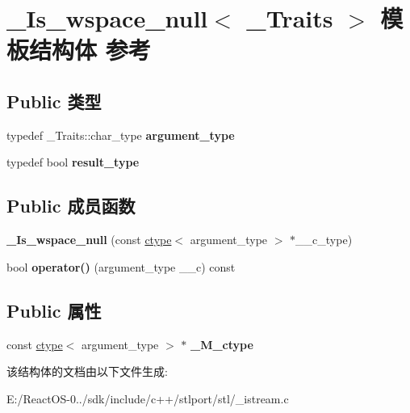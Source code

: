 \hypertarget{struct___is__wspace__null}{}\section{\+\_\+\+Is\+\_\+wspace\+\_\+null$<$ \+\_\+\+Traits $>$ 模板结构体 参考}
\label{struct___is__wspace__null}
\subsection*{Public 类型}
\begin{DoxyCompactItemize}
\item 
\mbox{\label{struct___is__wspace__null_ab95da17bf7ddaf02c1624ab22c1b61e3}} 
typedef \+\_\+\+Traits\+::char\+\_\+type {\bfseries argument\+\_\+type}
\item 
\mbox{\label{struct___is__wspace__null_a9008d4518f81aefc6f20ea789093bd7d}} 
typedef bool {\bfseries result\+\_\+type}
\end{DoxyCompactItemize}
\subsection*{Public 成员函数}
\begin{DoxyCompactItemize}
\item 
\mbox{\label{struct___is__wspace__null_a30d88e4164cb4baca81d94ea939d2359}} 
{\bfseries \+\_\+\+Is\+\_\+wspace\+\_\+null} (const \hyperlink{classctype}{ctype}$<$ argument\+\_\+type $>$ $\ast$\+\_\+\+\_\+c\+\_\+type)
\item 
\mbox{\label{struct___is__wspace__null_a425706d5e7e9728df34779bdf9d8bdd6}} 
bool {\bfseries operator()} (argument\+\_\+type \+\_\+\+\_\+c) const
\end{DoxyCompactItemize}
\subsection*{Public 属性}
\begin{DoxyCompactItemize}
\item 
\mbox{\label{struct___is__wspace__null_a2de39a1c6b6b5b56ec5a84085ef911ee}} 
const \hyperlink{classctype}{ctype}$<$ argument\+\_\+type $>$ $\ast$ {\bfseries \+\_\+\+M\+\_\+ctype}
\end{DoxyCompactItemize}


该结构体的文档由以下文件生成\+:\begin{DoxyCompactItemize}
\item 
E\+:/\+React\+O\+S-\/0../sdk/include/c++/stlport/stl/\+\_\+istream.\+c\end{DoxyCompactItemize}
